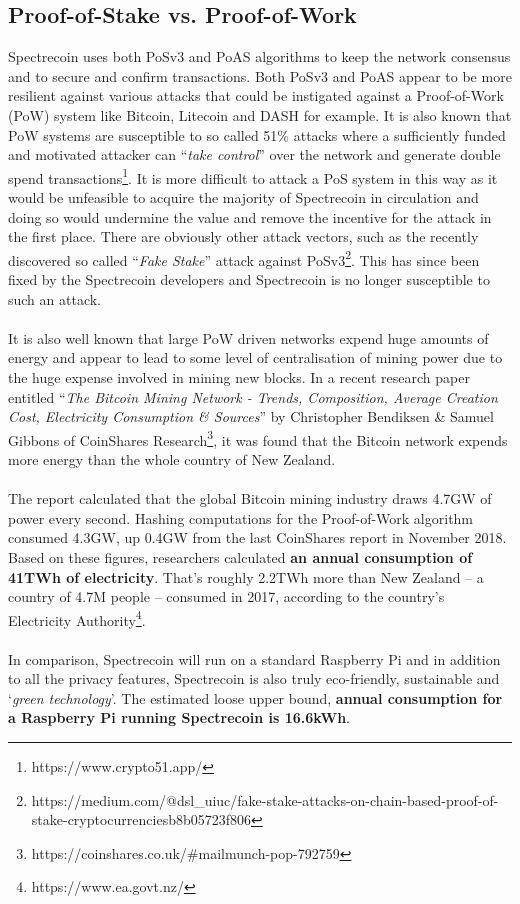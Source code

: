 \subsection{Proof-of-Stake vs. Proof-of-Work}
Spectrecoin uses both PoSv3 and PoAS algorithms to keep the network consensus and to secure and confirm transactions. Both PoSv3 and PoAS appear to be more resilient against various attacks that could be instigated against a Proof-of-Work (PoW) system like Bitcoin, Litecoin and DASH for example. It is also known that PoW systems are susceptible to so called 51\% attacks where a sufficiently funded and motivated attacker can “\textit{take control}” over the network and generate double spend transactions\footnote{https://www.crypto51.app/}. It is more difficult to attack a PoS system in this way as it would be unfeasible to acquire the majority of Spectrecoin in circulation and doing so would undermine the value and remove the incentive for the attack in the first place. There are obviously other attack vectors, such as the recently discovered so called “\textit{Fake Stake}” attack against PoSv3\footnote{https://medium.com/@dsl\_uiuc/fake-stake-attacks-on-chain-based-proof-of-stake-cryptocurrenciesb8b05723f806}. This has since been fixed by the Spectrecoin developers and Spectrecoin is no longer susceptible to such an attack.
\\
\\
\noindent
It is also well known that large PoW driven networks expend huge amounts of energy and appear to lead to some level of centralisation of mining power due to the huge expense involved in mining new blocks. In a recent research paper entitled “\textit{The Bitcoin Mining Network - Trends, Composition, Average Creation Cost, Electricity Consumption \& Sources}” by Christopher Bendiksen \& Samuel Gibbons of CoinShares  Research\footnote{https://coinshares.co.uk/\#mailmunch-pop-792759}, 
it was found that the Bitcoin network expends more energy than the whole country of New Zealand.
\\
\\
\noindent
The report calculated that the global Bitcoin mining industry draws 4.7GW of power every second. Hashing computations for the Proof-of-Work algorithm consumed 4.3GW, up 0.4GW from the last CoinShares report in November 2018. Based on these figures, researchers calculated \textbf{an annual consumption of 41TWh of electricity}. That’s roughly 2.2TWh more than New Zealand – a country of 4.7M people – consumed in 2017, according to the country’s Electricity Authority\footnote{https://www.ea.govt.nz/}.
\\
\\
\noindent
In comparison, Spectrecoin will run on a standard Raspberry Pi and in addition to all the privacy features, Spectrecoin is also truly eco-friendly, sustainable and ‘\textit{green technology}’. The estimated loose upper bound, \textbf{annual 
consumption for a Raspberry Pi running Spectrecoin is 16.6kWh}.

